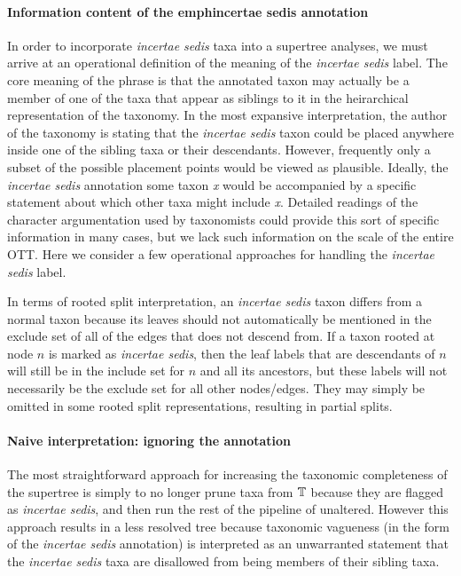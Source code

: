\documentclass[english]{article}
\begin{document}
\paragraph{Information content of the emph{incertae sedis }annotation}

In order to incorporate \emph{incertae sedis }taxa into a supertree
analyses, we must arrive at an operational definition of the meaning
of the \emph{incertae sedis} label. The core meaning of the phrase is
that the annotated taxon may actually be a member of one of the taxa
that appear as siblings to it in the heirarchical representation of
the taxonomy. In the most expansive interpretation, the author of the
taxonomy is stating that the \emph{incertae sedis} taxon could be
placed anywhere inside one of the sibling taxa or their descendants.
However, frequently only a subset of the possible placement points
would be viewed as plausible. Ideally, the \emph{incertae sedis}
annotation some taxon \emph{x} would be accompanied by a specific
statement about which other taxa might include \emph{x}. Detailed
readings of the character argumentation used by taxonomists could
provide this sort of specific information in many cases, but we lack
such information on the scale of the entire OTT. Here we consider a
few operational approaches for handling the \emph{incertae sedis}
label.

In terms of rooted split interpretation, an \emph{incertae sedis}
taxon differs from a normal taxon because its leaves should not
automatically be mentioned in the exclude set of all of the edges that
does not descend from. If a taxon rooted at node $n$ is marked as
\emph{incertae sedis}, then the leaf labels that are descendants of
$n$ will still be in the include set for $n$ and all its ancestors,
but these labels will not necessarily be the exclude set for all other
nodes/edges. They may simply be omitted in some rooted split
representations, resulting in partial splits.

\paragraph{Naive interpretation: ignoring the annotation}

The most straightforward approach for increasing the taxonomic
completeness of the supertree is simply to no longer prune taxa from
$\mbox{\ensuremath{\mathbb{T}}}$ because they are flagged as \emph{incertae sedis}, and
then run the rest of the pipeline of \citet{redelings2017supertree}
unaltered. However this approach results in a less resolved tree
because taxonomic vagueness (in the form of the \emph{incertae sedis}
annotation) is interpreted as an unwarranted statement that the
\emph{incertae sedis} taxa are disallowed from being members of their
sibling taxa.
\end{document}
